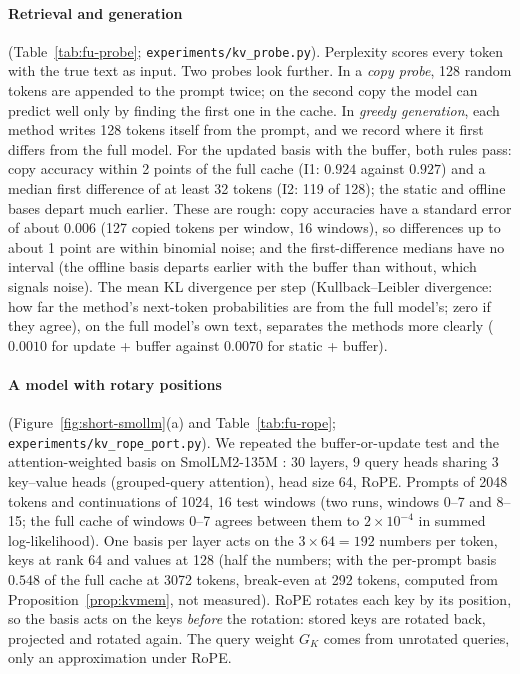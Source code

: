 \documentclass[10pt]{article}
\theoremstyle{plain}
\theoremstyle{definition}
\theoremstyle{remark}
\newcommand{\rl}[1]{\textsf{#1}}%
\begin{document}
\paragraph{Retrieval and generation} (Table~\ref{tab:fu-probe}; \texttt{experiments/kv\_probe.py}). Perplexity scores every token with the true text as input. Two probes look further. In a \emph{copy probe}, 128 random tokens are appended to the prompt twice; on the second copy the model can predict well only by finding the first one in the cache. In \emph{greedy generation}, each method writes 128 tokens itself from the prompt, and we record where it first differs from the full model. For the updated basis with the buffer, both rules pass: copy accuracy within 2 points of the full cache (\rl{I1}: $0.924$ against $0.927$) and a median first difference of at least 32 tokens (\rl{I2}: 119 of 128); the static and offline bases depart much earlier. These are rough: copy accuracies have a standard error of about $0.006$ (127 copied tokens per window, 16 windows), so differences up to about 1 point are within binomial noise; and the first-difference medians have no interval (the offline basis departs earlier with the buffer than without, which signals noise). The mean KL divergence per step (Kullback--Leibler divergence: how far the method's next-token probabilities are from the full model's; zero if they agree), on the full model's own text, separates the methods more clearly ($0.0010$ for update + buffer against $0.0070$ for static + buffer).

\paragraph{A model with rotary positions} (Figure~\ref{fig:short-smollm}(a) and Table~\ref{tab:fu-rope}; \texttt{experiments/kv\_rope\_port.py}). We repeated the buffer-or-update test and the attention-weighted basis on SmolLM2-135M \cite{allal2025smollm2}: 30 layers, 9 query heads sharing 3 key--value heads (grouped-query attention), head size 64, RoPE. Prompts of 2048 tokens and continuations of 1024, 16 test windows (two runs, windows 0--7 and 8--15; the full cache of windows 0--7 agrees between them to $2\times10^{-4}$ in summed log-likelihood). One basis per layer acts on the $3\times64=192$ numbers per token, keys at rank 64 and values at 128 (half the numbers; with the per-prompt basis $0.548$ of the full cache at 3072 tokens, break-even at 292 tokens, computed from Proposition~\ref{prop:kvmem}, not measured). RoPE rotates each key by its position, so the basis acts on the keys \emph{before} the rotation: stored keys are rotated back, projected and rotated again. The query weight $G_K$ comes from unrotated queries, only an approximation under RoPE.
\end{document}
